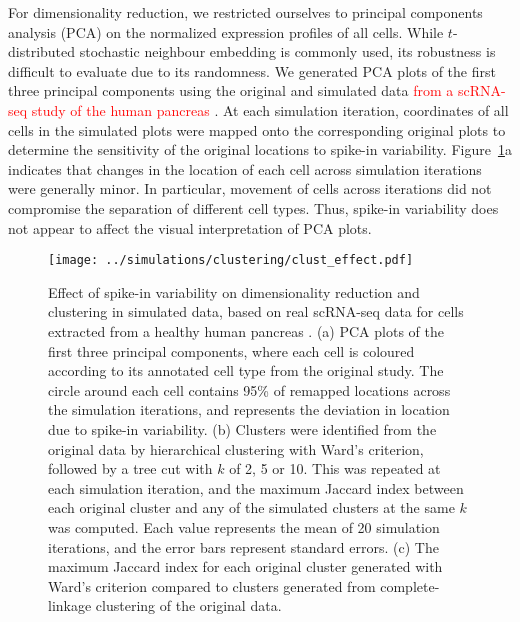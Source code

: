 \documentclass{article}
\newcommand{\revised}[1]{\textcolor{red}{#1}}
\begin{document}
For dimensionality reduction, we restricted ourselves to principal components analysis (PCA) on the normalized expression profiles of all cells. 
While $t$-distributed stochastic neighbour embedding \autocite{van2008visualizing} is commonly used, its robustness is difficult to evaluate due to its randomness.
We generated PCA plots of the first three principal components using the original and simulated data \revised{from a scRNA-seq study of the human pancreas \autocite{segerstople2016single}}.
At each simulation iteration, coordinates of all cells in the simulated plots were mapped onto the corresponding original plots to determine the sensitivity of the original locations to spike-in variability.
Figure~\ref{fig:dimclust}a indicates that changes in the location of each cell across simulation iterations were generally minor.
In particular, movement of cells across iterations did not compromise the separation of different cell types. 
Thus, spike-in variability does not appear to affect the visual interpretation of PCA plots.

\begin{figure}[btp]
    \begin{center}
        \texttt{[image: ../simulations/clustering/clust\_effect.pdf]}
    \end{center}
    \caption{Effect of spike-in variability on dimensionality reduction and clustering in simulated data,
        based on real scRNA-seq data for cells extracted from a healthy human pancreas \autocite{segerstople2016single}.
        (a) PCA plots of the first three principal components, where each cell is coloured according to its annotated cell type from the original study. 
        The circle around each cell contains 95\% of remapped locations across the simulation iterations, and represents the deviation in location due to spike-in variability.
        (b) Clusters were identified from the original data by hierarchical clustering with Ward's criterion, followed by a tree cut with $k$ of 2, 5 or 10.
        This was repeated at each simulation iteration, and the maximum Jaccard index between each original cluster and any of the simulated clusters at the same $k$ was computed.
        Each value represents the mean of 20 simulation iterations, and the error bars represent standard errors.
        (c) The maximum Jaccard index for each original cluster generated with Ward's criterion compared to clusters generated from complete-linkage clustering of the original data.
    }
    \label{fig:dimclust}
\end{figure}
\end{document}
